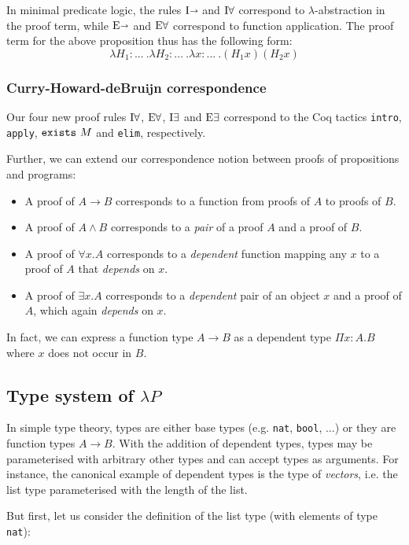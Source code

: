 In minimal predicate logic, the rules $\text{I} \kern -.25em \shortrightarrow$ and $\text{I} \forall$ correspond to
$\lambda$-abstraction in the proof term, while $\text{E} \kern -.25em \shortrightarrow$ and $\text{E} \forall$ correspond
to function application.
The proof term for the above proposition thus has the following form:
\[ \lambda H_1: ...\ .\lambda H_2: ...\ .\lambda x: ...\ . (H_1 x) (H_2 x) \]

\subsubsection{Curry-Howard-deBruĳn correspondence}
Our four new proof rules $\text{I} \forall$, $\text{E} \forall$, $\text{I} \exists$ and $\text{E} \exists$
correspond to the Coq tactics \verb|intro|, \verb|apply|, $\verb|exists|\ M$ and \verb|elim|, respectively.

Further, we can extend our correspondence notion between proofs of propositions and programs:
\begin{itemize}
    \item A proof of $A \to B$ corresponds to a function from proofs of $A$ to proofs of $B$.
    \item A proof of $A \land B$ corresponds to a \emph{pair} of a proof $A$ and a proof of $B$.
    \item A proof of $\forall x. A$ corresponds to a \emph{dependent} function mapping any $x$
          to a proof of $A$ that \emph{depends} on $x$.
    \item A proof of $\exists x. A$ corresponds to a \emph{dependent} pair of an object $x$ and
          a proof of $A$, which again \emph{depends} on $x$.
\end{itemize}

In fact, we can express a function type $A \to B$ as a dependent type $\Pi x : A. B$ where
$x$ does not occur in $B$.


\subsection{Type system of $\lambda P$}
In simple type theory, types are either base types (e.g. \verb|nat|, \verb|bool|, ...) or they are
function types $A \to B$.
With the addition of dependent types, types may be parameterised with arbitrary other types and
can accept types as arguments.
For instance, the canonical example of dependent types is the type of \emph{vectors},
i.e. the list type parameterised with the length of the list.

But first, let us consider the definition of the list type (with elements of type \verb|nat|):


